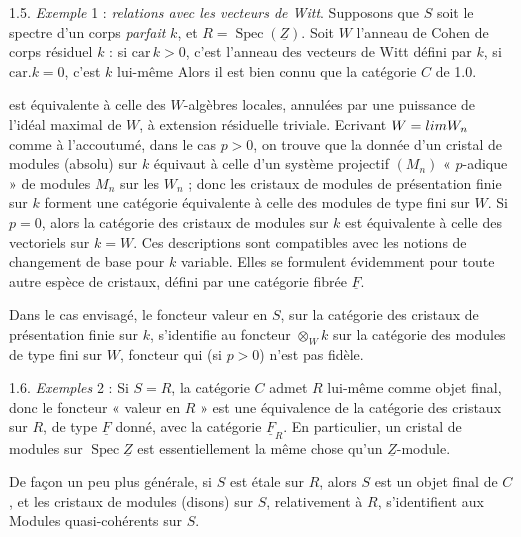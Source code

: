 \documentclass[11pt,a4paper]{article}
\begin{document}
1.5. \emph{Exemple} 1 : \emph{relations avec les vecteurs de Witt}. Supposons
que $S$ soit le spectre d'un corps \emph{parfait} $k$, et
$R=\operatorname{Spec}(\underline{Z})$. Soit $W$ l'anneau de Cohen de corps
résiduel $k$ : si $\mathrm{car}\,k>0$, c'est l'anneau des vecteurs de Witt
défini par $k$, si $\mathrm{car}.k=0$, c'est $k$ lui-même\supplied{;}  Alors il est bien connu
que la catégorie $C$ de 1.0.

est équivalente à celle des $W$-algèbres locales, annulées par une puissance
de l'idéal maximal de $W$, à extension résiduelle triviale. Ecrivant
$W=\varprojlim W_n$ comme à l'accoutumé, dans le cas $p>0$, on trouve que la
donnée d'un cristal de modules (absolu) sur $k$ équivaut à celle d'un système
projectif $(M_n)$ « $p$-adique » de modules $M_n$ sur les $W_n$ ; donc les
cristaux de modules de présentation finie sur $k$ forment une catégorie
équivalente à celle des modules de type fini sur $W$. Si $p=0$, alors la
catégorie des cristaux de modules sur $k$ est équivalente à celle des
vectoriels sur $k=W$. Ces descriptions sont compatibles avec les notions de
changement de base pour $k$ variable. Elles se formulent évidemment pour toute
autre espèce de cristaux, défini par une catégorie fibrée $\underline{F}$.

Dans le cas envisagé, le foncteur valeur en $S$, sur la
catégorie des cristaux de présentation finie sur $k$, s'identifie au foncteur
$\otimes_W k$ sur la catégorie des modules de type fini sur $W$, foncteur qui
(si $p>0$) n'est pas fidèle.

1.6. \emph{Exemples} 2 :  Si $S=R$, la
catégorie $C$ admet $R$ lui-même comme objet final, donc le foncteur « valeur
en $R$ » est une équivalence de la catégorie des cristaux sur $R$, de type
$\underline{F}$ donné, avec la catégorie $\underline{F}_R$. En particulier, un
cristal de modules sur $\operatorname{Spec}\underline{Z}$ est essentiellement
la même chose qu'un $\underline{Z}$-module.

De façon un peu plus générale, si $S$ est étale sur $R$, alors $S$ est un
objet final de $C$, et les cristaux de modules (disons) sur $S$, relativement à
$R$, s'identifient aux Modules quasi-cohérents sur $S$.
\end{document}
